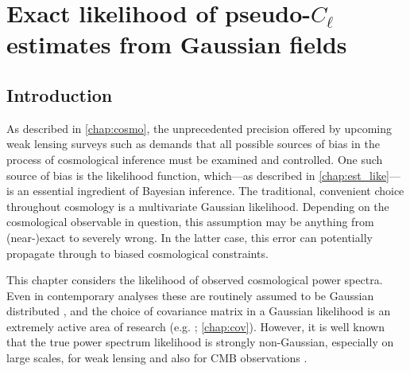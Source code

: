 
% 
% 

% 

\chapter{Exact likelihood of pseudo-\texorpdfstring{$C_\ell$}{Cl} estimates from Gaussian fields}
\label{chap:exact_like}
\graphicspath{{../Figs/exact_like/}{Figs/exact_like/}}


\section{Introduction}

As described in \autoref{chap:cosmo}, the unprecedented precision offered by upcoming weak lensing surveys such as \Euclid{} demands that all possible sources of bias in the process of cosmological inference must be examined and controlled. One such source of bias is the likelihood function, which---as described in \autoref{chap:est_like}---is an essential ingredient of Bayesian inference. The traditional, convenient choice throughout cosmology is a multivariate Gaussian likelihood. Depending on the cosmological observable in question, this assumption may be anything from (near-)exact to severely wrong. In the latter case, this error can potentially propagate through to biased cosmological constraints.

This chapter considers the likelihood of observed cosmological power spectra. Even in contemporary analyses these are routinely assumed to be Gaussian distributed \citep[e.g.][]{Hikage2019, Liu2018, Planck2018V}, and the choice of covariance matrix in a Gaussian likelihood is an extremely active area of research (e.g. \citealt{Kodwani2018, Harnois-Deraps2019}; \autoref{chap:cov}). However, it is well known that the true power spectrum likelihood is strongly non-Gaussian, especially on large scales, for weak lensing \citep{Hartlap2009, Sellentin2018, Sellentin2018a, Hall2022} and also for CMB observations \citep{Percival2006, Sun2013}.

